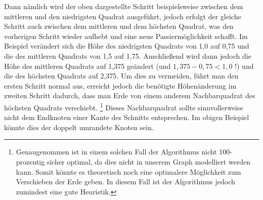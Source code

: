 \documentclass[a4paper, notitlepage, 12pt]{scrartcl}
\begin{document}
Dann nämlich wird der oben dargestellte Schritt beispielsweise zwischen dem mittleren und den niedrigsten Quadrat ausgeführt, jedoch erfolgt der gleiche Schritt auch zwischen dem mittleren und dem höchsten Quadrat, was den vorherigen Schritt wieder aufhebt und eine neue Passiermöglichkeit schafft. Im Beispiel verändert sich die Höhe des niedrigsten Quadrats von 1,0 auf 0,75 und die des mittleren Quadrats von 1,5 auf 1,75. Anschließend wird dann jedoch die Höhe des mittleren Quadrats auf 1,375 geändert (und $1,375 - 0,75 < 1,0 $ !) und die des höchsten Quadrats auf 2,375. Um dies zu vermeiden, führt man den ersten Schritt normal aus, erreicht jedoch die benötigte Höhenänderung im zweiten Schritt dadurch, dass man Erde von einem anderem Nachbarquadrat des höchsten Quadrats verschiebt. \footnote{Genaugenommen ist in einem solchen Fall der Algorithmus nicht 100-prozentig sicher optimal, da dies nicht in unserem Graph modelliert werden kann. Somit könnte es theoretisch noch eine optimalere Möglichkeit zum Verschieben der Erde geben. In diesem Fall ist der Algorithmus jedoch zumindest eine gute Heuristik.} Dieses Nachbarquadrat sollte sinnvollerweise nicht dem Endknoten einer Kante des Schnitts entsprechen. Im obigen Beispiel könnte dies der doppelt umrandete Knoten sein.
\end{document}
